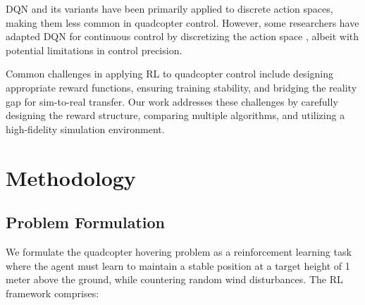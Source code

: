 \documentclass[12pt]{article}
\begin{document}
DQN and its variants have been primarily applied to discrete action spaces, making them less common in quadcopter control. However, some researchers have adapted DQN for continuous control by discretizing the action space \cite{yu2019dqncopter}, albeit with potential limitations in control precision.


Common challenges in applying RL to quadcopter control include designing appropriate reward functions, ensuring training stability, and bridging the reality gap for sim-to-real transfer. Our work addresses these challenges by carefully designing the reward structure, comparing multiple algorithms, and utilizing a high-fidelity simulation environment.


\section{Methodology}
\subsection{Problem Formulation}

We formulate the quadcopter hovering problem as a reinforcement learning task where the agent must learn to maintain a stable position at a target height of 1 meter above the ground, while countering random wind disturbances. The RL framework comprises:

\end{document}
